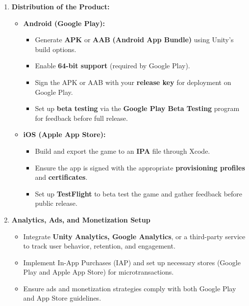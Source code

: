 \begin{enumerate}
\begin{itemize}
	\end{itemize}
	\item \textbf{Distribution of the Product:}
	\begin{itemize}
		\item \textbf{Android (Google Play):}
		\begin{itemize}
			\item {Generate \textbf{APK} or \textbf{AAB} \textbf{(Android App Bundle)} using Unity's build options.}
			\item {Enable \textbf{64-bit support} (required by Google Play).}
			\item {Sign the APK or AAB with your \textbf{release key} for deployment on Google Play.}
			\item {Set up \textbf{beta testing} via the \textbf{Google Play Beta Testing} program for feedback before full release.}
		\end{itemize}
		\item \textbf{iOS (Apple App Store):}
		\begin{itemize}
			\item {Build and export the game to an \textbf{IPA} file through Xcode.}
			\item {Ensure the app is signed with the appropriate \textbf{provisioning profiles} and \textbf{certificates}.}
			\item {Set up \textbf{TestFlight} to beta test the game and gather feedback before public release.}
		\end{itemize}
	\end{itemize}
	\item \textbf{Analytics, Ads, and Monetization Setup}
	\begin{itemize}
		\item {Integrate\textbf{ Unity Analytics, Google Analytics}, or a third-party service to track user behavior, retention, and engagement.}
		\item {Implement In-App Purchases (IAP) and set up necessary stores (Google Play and Apple App Store) for microtransactions.}
		\item {Ensure ads and monetization strategies comply with both Google Play and App Store guidelines.}
	\end{itemize}
\end{enumerate}